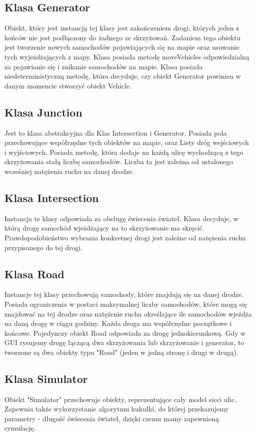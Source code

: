 \documentclass{article}
\begin{document}
\subsection{Klasa Generator}
    Obiekt, który jest instancją tej klasy jest zakończeniem drogi, których jeden z końców nie jest podłączony do żadnego ze skrzyżowań. Zadaniem tego obiektu jest tworzenie nowych samochodów pojawiających się na mapie oraz usuwanie tych wyjeżdżających z mapy. Klasa posiada metodę moveVehicles odpowiedzialną za pojawianie się i znikanie samochodów na mapie. Klasa posiada  niedeterministyczną metodę, która decyduje, czy obiekt Generator powinien w danym momencie stworzyć obiekt Vehicle.

\subsection{Klasa Junction}
    Jest to klasa abstrakcyjna dla Klas Intersection i Generator. Posiada pola przechowujące współrzędne tych obiektów na mapie, oraz Listy dróg wejściowych i wyjściowych. Posiada metodę, która dodaje na każdą ulicę wychodzącą z tego skrzyżowania stałą liczbę samochodów. Liczba ta jest zależna od ustalonego wcześniej natężenia ruchu na danej drodze.
\subsection{Klasa Intersection}
    Instancja te klasy odpowiada za obsługę świecenia świateł. Klasa decyduje, w którą drogę samochód wjeżdżający na to skrzyżowanie ma skręcić. Prawdopodobieństwo wybrania konkretnej drogi jest zależne od natężenia ruchu przypisanego do tej drogi.
\subsection{Klasa Road}
    Instancje tej klasy przechowują samochody, które znajdują się na danej drodze. Posiada ograniczenia w postaci maksymalnej liczby samochodów, które mogą się znajdować na tej drodze oraz natężenie ruchu określające ile samochodów wjeżdża na daną drogę w ciągu godziny. Każda droga ma współrzędne początkowe i końcowe. Pojedynczy obiekt Road odpowiada za drogę jednokierunkową. Gdy w GUI rysujemy drogę łączącą dwa skrzyżowania lub skrzyżowanie i generator, to tworzone są dwa obiekty typu "Road" (jeden w jedną stronę i drugi w drugą).
\subsection{Klasa Simulator}
    Obiekt "Simulator" przechowuje obiekty, reprezentujące cały model sieci ulic. Zapewnia także wykorzystanie algorytmu kukułki, do której przekazujemy parametry - długość świecenia świateł, dzięki czemu mamy zapewnioną symulację.
\end{document}
